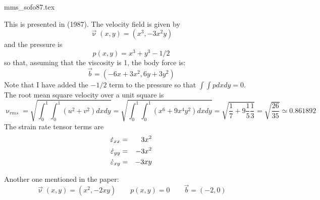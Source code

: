 \begin{flushright} {\tiny {\color{gray} mms\_sofo87.tex}} \end{flushright}

This is presented in \textcite{sofo87} (1987). The velocity field is given by
\[
\vec\upnu(x,y) = (x^3,-3x^2y) 
\]
and the pressure is 
\[
p(x,y)=x^3+y^3-1/2
\]
so that, assuming that the viscosity is 1, the body force is:
\[
\vec{b} = (-6x+3x^2,6y+3y^2)
\] 
Note that I have added the $-1/2$ term to the pressure so that $\int\int p dxdy=0$.
The root mean square velocity over a unit square is 
\[
\upnu_{rms} 
= \sqrt{ \int_0^1\int_0^1 (u^2+v^2) dx dy }
= \sqrt{ \int_0^1\int_0^1 (x^6 + 9 x^4 y^2) dx dy }
= \sqrt{ \frac{1}{7} + 9 \frac{1}{5} \frac{1}{3}  } 
= \sqrt{ \frac{26}{35} }
\simeq 0.861892 
\]
The strain rate tensor terms are
\begin{eqnarray}
\dot{\varepsilon}_{xx} &=& 3x^2  \nonumber\\
\dot{\varepsilon}_{yy} &=& -3x^2 \nonumber\\ 
\dot{\varepsilon}_{xy} &=& -3xy  \nonumber
\end{eqnarray}

Another one mentioned in the paper:
\[
\vec\upnu(x,y) =(x^2,-2xy)
\qquad
p(x,y)=0
\qquad
\vec{b}=(-2,0) 
\]


